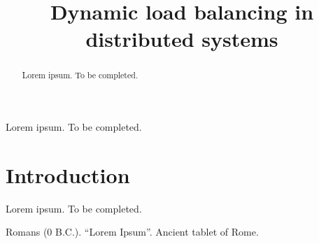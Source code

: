 \documentclass[conference]{IEEEtran}
\begin{document}
\title{Dynamic load balancing in distributed systems}

\author{
}
\maketitle

\begin{abstract}
    Lorem ipsum. To be completed.
\end{abstract}

\begin{IEEEkeywords}
    Lorem ipsum. To be completed.
\end{IEEEkeywords}

\section{Introduction}
    Lorem ipsum. To be completed.

\begin{thebibliography}{00}
     Romans (0 B.C.). ``Lorem Ipsum''. Ancient tablet of Rome.
\end{thebibliography}
\end{document}
